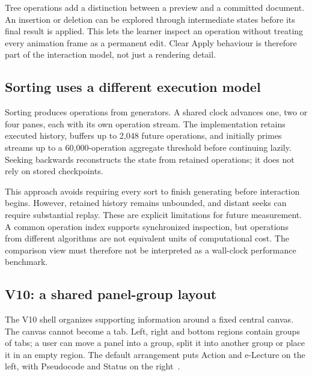 \documentclass[11pt,a4paper]{article}
\newcommand{\page}{\par\vspace{8pt}}
\begin{document}
Tree operations add a distinction between a preview and a committed document. An insertion or deletion can be explored through intermediate states before its final result is applied. This lets the learner inspect an operation without treating every animation frame as a permanent edit. Clear Apply behaviour is therefore part of the interaction model, not just a rendering detail.

\subsection{Sorting uses a different execution model}
Sorting produces operations from generators. A shared clock advances one, two or four panes, each with its own operation stream. The implementation retains executed history, buffers up to 2,048 future operations, and initially primes streams up to a 60,000-operation aggregate threshold before continuing lazily. Seeking backwards reconstructs the state from retained operations; it does not rely on stored checkpoints.

This approach avoids requiring every sort to finish generating before interaction begins. However, retained history remains unbounded, and distant seeks can require substantial replay. These are explicit limitations for future measurement. A common operation index supports synchronized inspection, but operations from different algorithms are not equivalent units of computational cost. The comparison view must therefore not be interpreted as a wall-clock performance benchmark.

\page
\subsection{V10: a shared panel-group layout}\label{sec:v10}
The V10 shell organizes supporting information around a fixed central canvas. The canvas cannot become a tab. Left, right and bottom regions contain groups of tabs; a user can move a panel into a group, split it into another group or place it in an empty region. The default arrangement puts Action and e-Lecture on the left, with Pseudocode and Status on the right~\cite{architecture}.
\end{document}
